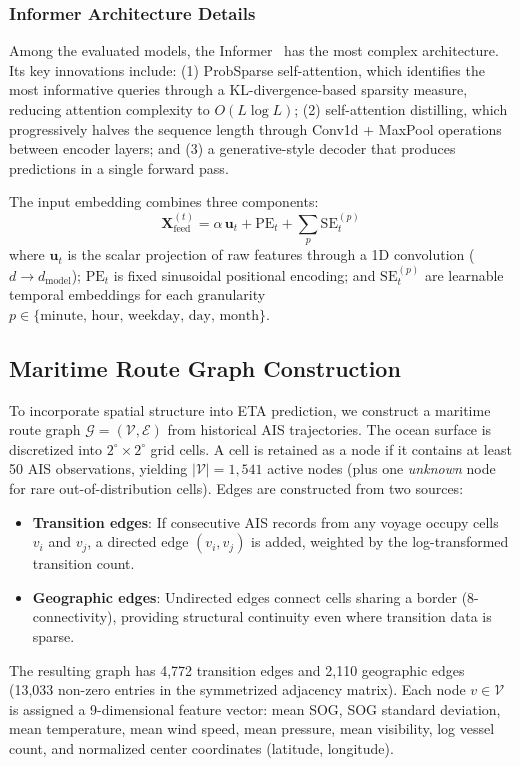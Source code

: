 \documentclass[conference]{IEEEtran}
\begin{document}
\subsubsection{Informer Architecture Details}

Among the evaluated models, the Informer~\cite{zhou2021informer} has the most complex architecture.
Its key innovations include:
(1) ProbSparse self-attention, which identifies the most informative queries through a KL-divergence-based sparsity measure, reducing attention complexity to $O(L \log L)$;
(2) self-attention distilling, which progressively halves the sequence length through Conv1d + MaxPool operations between encoder layers;
and (3) a generative-style decoder that produces predictions in a single forward pass.

The input embedding combines three components:
\begin{equation}
    \mathbf{X}_{\text{feed}}^{(t)} = \alpha \, \mathbf{u}_t + \text{PE}_{t} + \sum_{p} \text{SE}_{t}^{(p)}
    \label{eq:embedding}
\end{equation}
where $\mathbf{u}_t$ is the scalar projection of raw features through a 1D convolution ($d \to d_{\text{model}}$); $\text{PE}_{t}$ is fixed sinusoidal positional encoding; and $\text{SE}_{t}^{(p)}$ are learnable temporal embeddings for each granularity $p \in \{\text{minute, hour, weekday, day, month}\}$.

\subsection{Maritime Route Graph Construction}
\label{sec:route_graph}

To incorporate spatial structure into ETA prediction, we construct a maritime route graph $\mathcal{G} = (\mathcal{V}, \mathcal{E})$ from historical AIS trajectories.
The ocean surface is discretized into $2^\circ \times 2^\circ$ grid cells.
A cell is retained as a node if it contains at least 50 AIS observations, yielding $|\mathcal{V}| = 1{,}541$ active nodes (plus one \textit{unknown} node for rare out-of-distribution cells).
Edges are constructed from two sources:
\begin{itemize}
    \item \textbf{Transition edges}: If consecutive AIS records from any voyage occupy cells $v_i$ and $v_j$, a directed edge $(v_i, v_j)$ is added, weighted by the log-transformed transition count.
    \item \textbf{Geographic edges}: Undirected edges connect cells sharing a border (8-connectivity), providing structural continuity even where transition data is sparse.
\end{itemize}
The resulting graph has 4{,}772 transition edges and 2{,}110 geographic edges (13{,}033 non-zero entries in the symmetrized adjacency matrix).
Each node $v \in \mathcal{V}$ is assigned a 9-dimensional feature vector: mean SOG, SOG standard deviation, mean temperature, mean wind speed, mean pressure, mean visibility, log vessel count, and normalized center coordinates (latitude, longitude).
\end{document}
